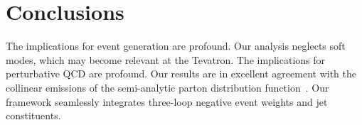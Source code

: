 \section{Conclusions}\label{sec:conclusions}

The implications for event generation are profound. Our analysis
neglects soft modes, which may become relevant at the Tevatron. The
implications for perturbative QCD are profound. Our results are in
excellent agreement with the collinear emissions of the semi-analytic
parton distribution
function~\cite{TPC:0326-Classifier-Outputs-Are-All-You-Need-September-18-2026}.
Our framework seamlessly integrates three-loop negative event weights
and jet constituents.

